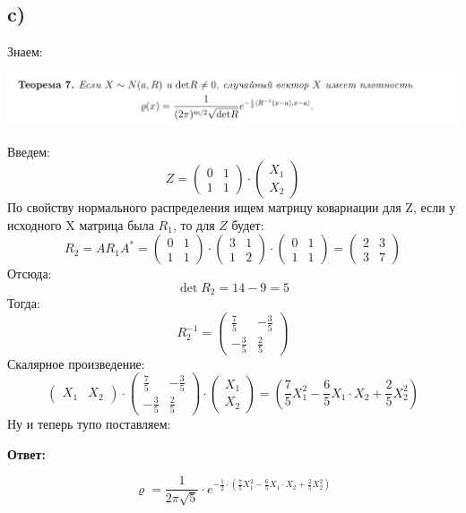 \documentclass[a4paper,12pt]{article}
\begin{document}
\subsection*{c)}
Знаем:
\begin{center}
\includegraphics[scale=0.3]{2.png}
\end{center}
Введем:
\[
Z = \begin{pmatrix}
0 & 1 \\ 1 & 1 
\end{pmatrix} \cdot 
\begin{pmatrix}
X_1 \\ X_2
\end{pmatrix}
\]
По свойству нормального распределения ищем матрицу ковариации для Z, если у исходного X матрица была $R_1$, то для $Z$ будет:
\[
R_2 = 
AR_1A^{*} =  \begin{pmatrix}
0 & 1 \\ 1 & 1 
\end{pmatrix} \cdot \begin{pmatrix}
3  & 1\\ 1 & 2
\end{pmatrix} \cdot \begin{pmatrix}
0 & 1 \\ 1 & 1 
\end{pmatrix} = \begin{pmatrix}
2 & 3 \\ 3 & 7 
\end{pmatrix}
\]
Отсюда:
\[
\det R_2 =  14 - 9 = 5
\]
Тогда:
\[
R_2^{-1} = \left(\begin{matrix}
\frac{7}{5} & -\frac{3}{5} \\
-\frac{3}{5} & \frac{2}{5}
\end{matrix}\right)
\] 
Скалярное произведение:
\[
\begin{pmatrix}
X_1 & X_2 
\end{pmatrix}
\cdot 
\left(\begin{matrix}
\frac{7}{5} & -\frac{3}{5} \\
-\frac{3}{5} & \frac{2}{5}
\end{matrix}\right)
\cdot
\begin{pmatrix}
X_1 \\ X_2 
\end{pmatrix} = \left(
\frac{7}{5}X_1^2 - \frac{6}{5}X_1 \cdot X_2 + \frac{2}{5} X_2^2 \right)
\]
Ну и теперь тупо поставляем:
\begin{center}
\textbf{Ответ: } 
\end{center}
\[
\varrho = \frac{1}{2\pi \sqrt{5}} \cdot e^{-\frac{1}{2} \cdot \left(
\frac{7}{5}X_1^2 - \frac{6}{5}X_1 \cdot X_2 + \frac{2}{5} X_2^2 \right)}
\]
\end{document}
